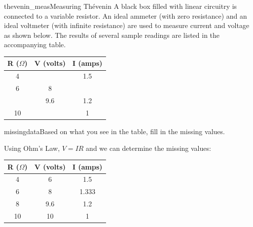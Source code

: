 \begin{mainquestion}{thevenin_meas}{Measuring Thévenin}
A black box filled with linear circuitry is connected to a variable resistor.  An ideal ammeter (with zero resistance) and an ideal voltmeter (with infinite resistance) are used to measure current and voltage as shown below. The results of several sample readings are listed in the accompanying table.

\begin{table}[htbp]
\centering
\label{tab:measurements}
\begin{tabular}{|c | c |  c|}
\hline
\textbf{R ($\Omega$)} & \textbf{V (volts)} & \textbf{I (amps)} \\
\hline
4 &  & 1.5 \\ \hline
6 & 8 & \\ \hline
 & 9.6 & 1.2 \\ \hline
10 &  & 1 \\ \hline

\end{tabular}
\end{table}

\begin{partquestion}{missingdata}{Based on what you see in the table, fill in the missing values.}
\begin{answer}
Using Ohm's Law, $V=IR$ and we can determine the missing values:
\begin{table}[htbp]
\centering
\label{tab:measurementsfilled}
\begin{tabular}{|c | c |  c|}
\hline
\textbf{R ($\Omega$)} & \textbf{V (volts)} & \textbf{I (amps)} \\
\hline
4 & 6 & 1.5 \\ \hline
6 & 8 & 1.333\\ \hline
8 & 9.6 & 1.2 \\ \hline
10 & 10  & 1 \\ \hline
\end{tabular}
\end{table}
\end{answer}
\end{partquestion}


\end{mainquestion}
